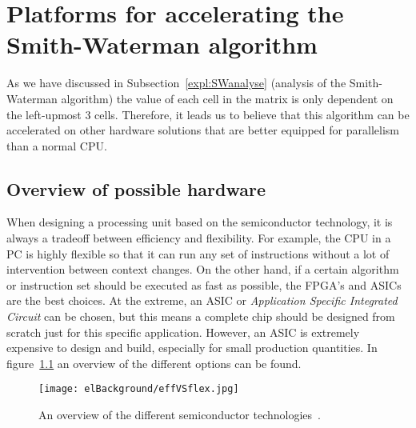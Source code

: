 
\chapter{Platforms for accelerating the Smith-Waterman algorithm}
\label{ch:Platforms}

As we have discussed in Subsection~\ref{expl:SWanalyse} (analysis of the Smith-Waterman algorithm) the value of each cell in the matrix is only dependent on the left-upmost 3 cells. Therefore, it leads us to believe that this algorithm can be accelerated on other hardware solutions that are better equipped for parallelism than a normal CPU.

\section{Overview of possible hardware}

When designing a processing unit based on the semiconductor technology, it is always a tradeoff between efficiency and flexibility. For example, the CPU in a PC is highly flexible so that it can run any set of instructions without a lot of intervention between context changes. On the other hand, if a certain algorithm or instruction set should be executed as fast as possible, the FPGA's and ASICs are the best choices. At the extreme, an ASIC or \emph{Application Specific Integrated Circuit} can be chosen, but this means a complete chip should be designed from scratch just for this specific application. However, an ASIC is extremely expensive to design and build, especially for small production quantities. In figure~\ref{fig:effVSflex} an overview of the different options can be found.

\begin{figure}[H]
	\centering
	\texttt{[image: elBackground/effVSflex.jpg]}
	\caption{An overview of the different semiconductor technologies~\cite{fpgacomparison}.}
	\label{fig:effVSflex}
\end{figure}


